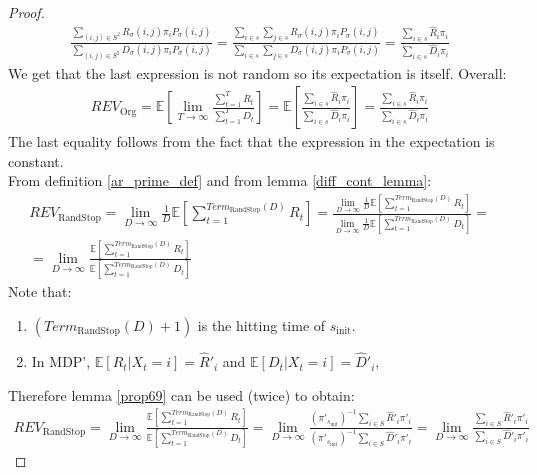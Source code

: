 \documentclass{article}
\newcommand{\E}[1]{\mathbb{E} \left[ #1 \right]}
\newcommand{\revorg}{\textit{REV}_\text{Org}}
\newcommand{\revaux}{\textit{REV}_\text{RandStop}}
\newcommand{\termaux}{\textit{Term}_\text{RandStop}}
\begin{document}
\begin{proof}
\begin{gather*}
        \frac{\sum\limits_{(i,j) \in S^2} R_\sigma(i,j) \pi_i P_\sigma(i,j)}{\sum\limits_{(i,j) \in S^2} D_\sigma(i,j) \pi_i P_\sigma(i,j)} = \frac{\sum\limits_{i \in s} \sum\limits_{j \in s} R_\sigma(i,j) \pi_i P_\sigma(i,j)}{\sum\limits_{i \in s} \sum\limits_{j \in s} D_\sigma(i,j) \pi_i P_\sigma(i,j)} = \frac{\sum\limits_{i \in s} \hat{R}_i \pi_i}{\sum\limits_{i \in s} \hat{D}_i \pi_i}
    \end{gather*}
    We get that the last expression is not random so its expectation is itself. Overall:
    \begin{gather*}
        \revorg = \E{\lim\limits_{T\to\infty} \frac{\sum\limits_{t=1}^T R_t}{\sum\limits_{t=1}^T D_t}} = \E{\frac{\sum\limits_{i \in s} \hat{R}_i \pi_i}{\sum\limits_{i \in s} \hat{D}_i \pi_i}} = \frac{\sum\limits_{i \in s} \hat{R}_i \pi_i}{\sum\limits_{i \in s} \hat{D}_i \pi_i}
    \end{gather*}
    The last equality follows from the fact that the expression in the expectation is constant. \\
    From definition \ref{ar_prime_def} and from lemma \ref{diff_cont_lemma}:
    \begin{gather*}
        \revaux = \lim\limits_{D\to\infty} \frac{1}{D}\E{\sum\limits_{t=1}^{\termaux(D)} R_t} = \frac{\lim\limits_{D\to\infty} \frac{1}{D}\E{\sum\limits_{t=1}^{\termaux(D)} R_t}}{{\lim\limits_{D\to\infty} \frac{1}{D} \E{\sum\limits_{t=1}^{\termaux(D)} D_t}}} = \\
        = \lim\limits_{D\to\infty} \frac{\E{\sum\limits_{t=1}^{\termaux(D)} R_t}}{{\E{\sum\limits_{t=1}^{\termaux(D)} D_t}}}
    \end{gather*}
    Note that:
    \begin{enumerate}
        \item $(\termaux(D) + 1)$ is the hitting time of $s_\text{init}$.
        \item In MDP', $\E{R_t | X_t = i} = \hat{R}'_i$ and $\E{D_t | X_t = i} = \hat{D}'_i$,
    \end{enumerate}
    Therefore lemma \ref{prop69} can be used (twice) to obtain:
    \begin{gather*}
        \revaux = \lim\limits_{D\to\infty} \frac{\E{\sum\limits_{t=1}^{\termaux(D)} R_t}}{{\E{\sum\limits_{t=1}^{\termaux(D)} D_t}}} = \lim\limits_{D\to\infty} \frac{(\pi'_{s_\text{init}})^{-1} \sum\limits_{i \in S} \hat{R}'_i \pi'_i}{(\pi'_{s_\text{init}})^{-1} \sum\limits_{i \in S} \hat{D}'_i \pi'_i} = \lim\limits_{D\to\infty} \frac{\sum\limits_{i \in S} \hat{R}'_i \pi'_i}{\sum\limits_{i \in S} \hat{D}'_i \pi'_i}

\end{gather*}
\end{proof}
\end{document}
